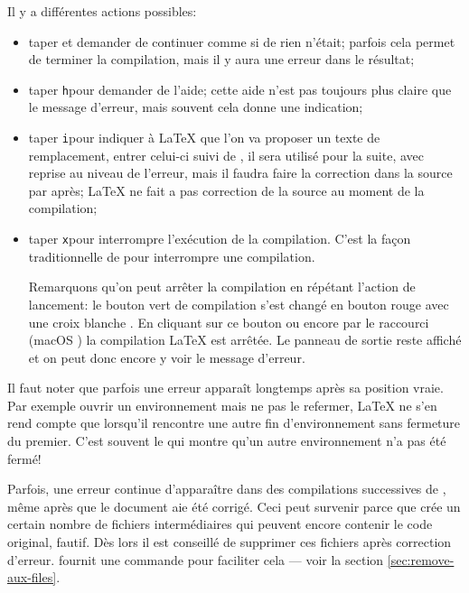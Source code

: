 Il y a différentes actions possibles:
\begin{itemize}
\item taper \Return et demander de continuer comme si de rien n'était; parfois cela permet de terminer la compilation, mais il y aura une erreur dans le résultat;
\item taper \verb+h+\Return pour demander de l'aide; cette aide n'est pas toujours plus claire que le message d'erreur, mais souvent cela donne une indication;
\item taper \verb+i+\Return pour indiquer à \LaTeX{} que l'on va proposer un texte de remplacement, entrer celui-ci suivi de \Return, il sera utilisé pour la suite, avec reprise au niveau de l'erreur, mais il faudra faire la correction dans la source par après; \LaTeX{} ne fait a pas correction de la source au moment de la compilation;
\item taper \verb=x=\Return pour interrompre l'exécution de la compilation. C'est la façon traditionnelle de \AllTeX{} pour interrompre une compilation.

Remarquons qu'on peut arrêter la compilation en répétant l'action de lancement: le bouton vert de compilation s'est changé en bouton rouge avec une croix blanche . En cliquant sur ce bouton ou encore par le raccourci  (macOS ) la compilation \LaTeX{} est arrêtée. Le panneau de sortie reste affiché et on peut donc encore y voir le message d'erreur.
\end{itemize}

Il faut noter que parfois une erreur apparaît longtemps après sa position vraie. Par exemple ouvrir un environnement mais ne pas le refermer, \LaTeX{} ne s'en rend compte que lorsqu'il rencontre une autre fin d'environnement sans fermeture du premier. C'est souvent le \verb++ qui montre qu'un autre environnement n'a pas été fermé!

Parfois, une erreur continue d'apparaître dans des compilations successives de \AllTeX{}, même après que le document aie été corrigé. Ceci peut survenir parce que \AllTeX{} crée un certain nombre de fichiers intermédiaires qui peuvent encore contenir le code original, fautif. Dès lors il est conseillé de supprimer ces fichiers après correction d'erreur. \Tw{} fournit une commande pour faciliter cela --- voir la section \ref{sec:remove-aux-files}.

